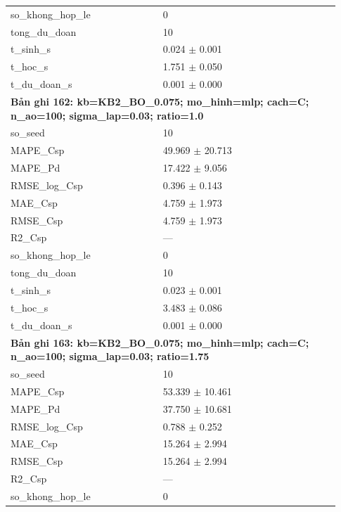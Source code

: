 \begin{longtable}{p{0.43\linewidth}p{0.50\linewidth}}
so\_\allowbreak khong\_\allowbreak hop\_\allowbreak le & 0 \\
tong\_\allowbreak du\_\allowbreak doan & 10 \\
t\_\allowbreak sinh\_\allowbreak s & 0.024 $\pm$ 0.001 \\
t\_\allowbreak hoc\_\allowbreak s & 1.751 $\pm$ 0.050 \\
t\_\allowbreak du\_\allowbreak doan\_\allowbreak s & 0.001 $\pm$ 0.000 \\
\midrule
\multicolumn{2}{p{0.95\linewidth}}{\textbf{Bản ghi 162: kb=KB2\_BO\_0.075; mo\_hinh=mlp; cach=C; n\_ao=100; sigma\_lap=0.03; ratio=1.0}} \\
so\_\allowbreak seed & 10 \\
MAPE\_\allowbreak Csp & 49.969 $\pm$ 20.713 \\
MAPE\_\allowbreak Pd & 17.422 $\pm$ 9.056 \\
RMSE\_\allowbreak log\_\allowbreak Csp & 0.396 $\pm$ 0.143 \\
MAE\_\allowbreak Csp & 4.759 $\pm$ 1.973 \\
RMSE\_\allowbreak Csp & 4.759 $\pm$ 1.973 \\
R2\_\allowbreak Csp & — \\
so\_\allowbreak khong\_\allowbreak hop\_\allowbreak le & 0 \\
tong\_\allowbreak du\_\allowbreak doan & 10 \\
t\_\allowbreak sinh\_\allowbreak s & 0.023 $\pm$ 0.001 \\
t\_\allowbreak hoc\_\allowbreak s & 3.483 $\pm$ 0.086 \\
t\_\allowbreak du\_\allowbreak doan\_\allowbreak s & 0.001 $\pm$ 0.000 \\
\midrule
\multicolumn{2}{p{0.95\linewidth}}{\textbf{Bản ghi 163: kb=KB2\_BO\_0.075; mo\_hinh=mlp; cach=C; n\_ao=100; sigma\_lap=0.03; ratio=1.75}} \\
so\_\allowbreak seed & 10 \\
MAPE\_\allowbreak Csp & 53.339 $\pm$ 10.461 \\
MAPE\_\allowbreak Pd & 37.750 $\pm$ 10.681 \\
RMSE\_\allowbreak log\_\allowbreak Csp & 0.788 $\pm$ 0.252 \\
MAE\_\allowbreak Csp & 15.264 $\pm$ 2.994 \\
RMSE\_\allowbreak Csp & 15.264 $\pm$ 2.994 \\
R2\_\allowbreak Csp & — \\
so\_\allowbreak khong\_\allowbreak hop\_\allowbreak le & 0 \\

\end{longtable}
